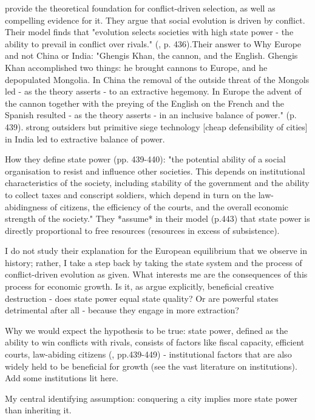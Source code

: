 \documentclass{article}
\begin{document}
\cite{levine2013, levine2021} provide the theoretical foundation for conflict-driven selection, as well as compelling evidence for it. 
They argue that social evolution is driven by conflict. Their model finds that "evolution selects societies with high state power - the ability to prevail in conflict over rivals." (\citealp{levine2021}, p. 436).Their answer to Why Europe and not China or India: "Ghengis Khan, the cannon, and the English. Ghengis Khan accomplished two things: he brought cannons to Europe, and he depopulated Mongolia. In China the removal of the outside threat of the Mongols led - as the theory asserts - to an extractive hegemony. In Europe the advent of the cannon together with the preying of the English on the French and the Spanish resulted - as the theory asserts - in an inclusive balance of power." (p. 439). strong outsiders but primitive siege technology [cheap defensibility of cities] in India led to extractive balance of power.  


How they define state power (pp. 439-440): "the potential ability of a social organisation to resist and influence other societies. This depends on institutional characteristics of the society, including stability of the government and the ability to collect taxes and conscript soldiers, which depend in turn on the law-abidingness of citizens, the efficiency of the courts, and the overall economic strength of the society." They *assume* in their model (p.443) that state power is directly proportional to free resources (resources in excess of subsistence).


I do not study their explanation for the European equilibrium that we observe in history; rather, I take a step back by taking the state system and the process of conflict-driven evolution as given. What interests me are the consequences of this process for economic growth.
Is it, as \cite{schoenholzer2022} argue explicitly, beneficial creative destruction - does state power equal state quality? Or are powerful states detrimental after all - because they engage in more extraction? \cite{tilly1985}


Why we would expect the hypothesis to be true: state power, defined as the ability to win conflicts with rivals, consists of factors like fiscal capacity, efficient courts, law-abiding citizens (\citealp{levine2021}, pp.439-449) - institutional factors that are also widely held to be beneficial for growth (see the vast literature on institutions). Add some institutions lit here.


My central identifying assumption: conquering a city implies more state power than inheriting it.
\end{document}
